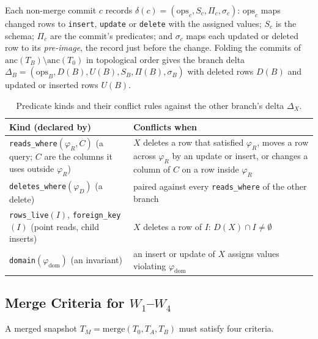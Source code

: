 \documentclass[sigconf, nonacm]{acmart}
\begin{document}
\begin{definition}
Each non-merge commit $c$ records $\delta(c) = (\text{ops}_c, S_c, \Pi_c, \sigma_c)$: $\text{ops}_c$ maps changed rows to \texttt{insert}, \texttt{update} or \texttt{delete} with the assigned values; $S_c$ is the schema; $\Pi_c$ are the commit's predicates; and $\sigma_c$ maps each updated or deleted row to its \emph{pre-image}, the record just before the change. Folding the commits of $\text{anc}(T_B) \setminus \text{anc}(T_0)$ in topological order gives the branch delta $\Delta_B = (\text{ops}_B, D(B), U(B), S_B, \Pi(B), \sigma_B)$ with deleted rows $D(B)$ and updated or inserted rows $U(B)$.
\end{definition}

\begin{table}[t]
\centering
\scriptsize
\caption{Predicate kinds and their conflict rules against the other branch's delta $\Delta_X$.}
\label{tab:predicates}
\setlength{\tabcolsep}{2.5pt}
\renewcommand{\arraystretch}{0.9}
\begin{tabularx}{\columnwidth}{@{}l X@{}}
\toprule
\textbf{Kind (declared by)} & \textbf{Conflicts when} \\
\midrule
\texttt{reads\_where}$(\varphi_R, C)$ (a query; $C$ are the columns it uses outside $\varphi_R$) & $X$ deletes a row that satisfied $\varphi_R$, moves a row across $\varphi_R$ by an update or insert, or changes a column of $C$ on a row inside $\varphi_R$ \\
\texttt{deletes\_where}$(\varphi_D)$ (a delete) & paired against every \texttt{reads\_where} of the other branch \\
\texttt{rows\_live}$(I)$, \texttt{foreign\_key}$(I)$ (point reads, child inserts) & $X$ deletes a row of $I$: $D(X) \cap I \neq \emptyset$ \\
\texttt{domain}$(\varphi_{\text{dom}})$ (an invariant) & an insert or update of $X$ assigns values violating $\varphi_{\text{dom}}$ \\
\bottomrule
\end{tabularx}
\end{table}

\subsection{Merge Criteria for $W_1$--$W_4$}
\label{sec:model_predicates}

A merged snapshot $T_M = \text{merge}(T_0, T_A, T_B)$ must satisfy four criteria.
\end{document}
